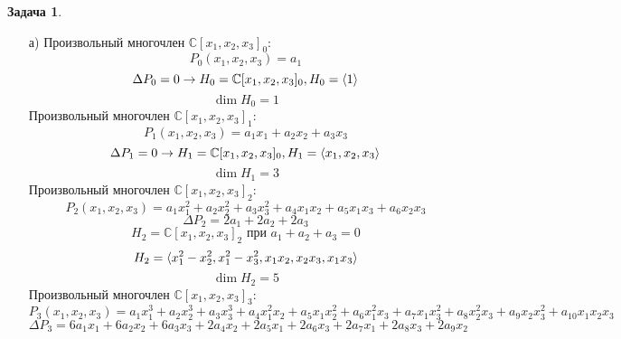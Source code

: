\documentclass[12pt]{article}
\theoremstyle{definition}
\newtheorem{zad}{Задача}[section]
\begin{document}
\begin{zad}
\begin{itemize}
    \item[а)] Произвольный многочлен $\mathbb{C}[x_1,x_2,x_3]_0$:
    \begin{equation}
        P_0(x_1,x_2,x_3)=a_1
    \end{equation}
    \begin{equation}
        \Delta P_0=0\rightarrow H_0=\mathbb{C}[x_1,x_2,x_3]_0, H_0=\braket{1}
    \end{equation}
    \begin{equation}
        \boxed{\dim H_0=1}
    \end{equation}
    Произвольный многочлен $\mathbb{C}[x_1,x_2,x_3]_1$:
    \begin{equation}
        P_1(x_1,x_2,x_3)=a_1x_1+a_2x_2+a_3x_3
    \end{equation}
    \begin{equation}
        \Delta P_1=0\rightarrow H_1=\mathbb{C}[x_1,x_2,x_3]_0, H_1=\braket{x_1,x_2,x_3}
    \end{equation}
    \begin{equation}
        \boxed{\dim H_1=3}
    \end{equation}
    Произвольный многочлен $\mathbb{C}[x_1,x_2,x_3]_2$:
    \begin{equation}
        P_2(x_1,x_2,x_3)=a_1x_1^2+a_2x_2^2+a_3x_3^2+a_4x_1x_2+a_5x_1x_3+a_6x_2x_3
    \end{equation}
    \begin{equation}
        \Delta P_2=2a_1+2a_2+2a_3
    \end{equation}
    \begin{equation}
    H_2=\mathbb{C}[x_1,x_2,x_3]_2 \text{ при } a_1+a_2+a_3=0
    \end{equation}
    \begin{equation}
         H_2=\braket{x_1^2-x_2^2,x_1^2-x_3^2,x_1x_2,x_2x_3,x_1x_3}
    \end{equation}
    \begin{equation}
        \boxed{\dim H_2=5}
    \end{equation}
    Произвольный многочлен $\mathbb{C}[x_1,x_2,x_3]_3$:
    \begin{equation*}
        P_3(x_1,x_2,x_3)=a_1x_1^3+a_2x_2^3+a_3x_3^3+a_4x_1^2x_2+a_5x_1x_2^2+a_6x_1^2x_3+a_7x_1x_3^2+a_8x_2^2x_3+a_9x_2x_3^2+a_{10}x_1x_2x_3
    \end{equation*}
    \begin{equation}
        \Delta P_3=6a_1x_1+6a_2x_2+6a_3x_3+2a_4x_2+2a_5x_1+2a_6x_3+2a_7x_1+2a_8x_3+2a_9x_2

\end{equation}
\end{itemize}
\end{zad}
\end{document}
